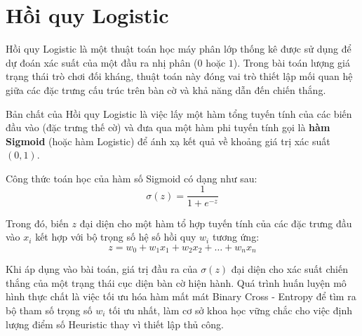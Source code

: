 \section{Hồi quy Logistic}
Hồi quy Logistic là một thuật toán học máy phân lớp thống kê được sử dụng để dự đoán xác suất của một đầu ra nhị phân ($0$ hoặc $1$). Trong bài toán lượng giá trạng thái trò chơi đối kháng, thuật toán này đóng vai trò thiết lập mối quan hệ giữa các đặc trưng cấu trúc trên bàn cờ và khả năng dẫn đến chiến thắng.

Bản chất của Hồi quy Logistic là việc lấy một hàm tổng tuyến tính của các biến đầu vào (đặc trưng thế cờ) và đưa qua một hàm phi tuyến tính gọi là \textbf{hàm Sigmoid} (hoặc hàm Logistic) để ánh xạ kết quả về khoảng giá trị xác suất $(0, 1)$.

Công thức toán học của hàm số Sigmoid có dạng như sau:
\begin{equation}
	\sigma(z) = \frac{1}{1 + e^{-z}}
\end{equation}

Trong đó, biến $z$ đại diện cho một hàm tổ hợp tuyến tính của các đặc trưng đầu vào $x_i$ kết hợp với bộ trọng số hệ số hồi quy $w_i$ tương ứng:
\begin{equation}
	z = w_0 + w_1 x_1 + w_2 x_2 + \dots + w_n x_n
\end{equation}
	
Khi áp dụng vào bài toán, giá trị đầu ra của $\sigma(z)$ đại diện cho xác suất chiến thắng của một trạng thái cục diện bàn cờ hiện hành. Quá trình huấn luyện mô hình thực chất là việc tối ưu hóa hàm mất mát Binary Cross -  Entropy để tìm ra bộ tham số trọng số $w_i$ tối ưu nhất, làm cơ sở khoa học vững chắc cho việc định lượng điểm số Heuristic thay vì thiết lập thủ công.
